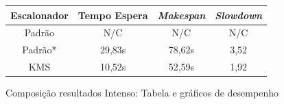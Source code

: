 \begin{figure}[!ht]
	\centering
	\begin{tabular}[b]{cccc}\hline
		Escalonador & Tempo Espera & \textit{Makespan} & \textit{Slowdown}\\ \hline
		Padrão  & N/C & N/C & N/C\\
		Padrão* & 29,83s  & 78,62s & 3,52 \\
		KMS     & 10,52s & 52,59s & 1,92 \\ \hline
	\end{tabular}
	\qquad
	\qquad
	\qquad
	\caption{Composição resultados Intenso: Tabela e gráficos de desempenho}
	\label{fig:cenario-intenso}
\end{figure}

